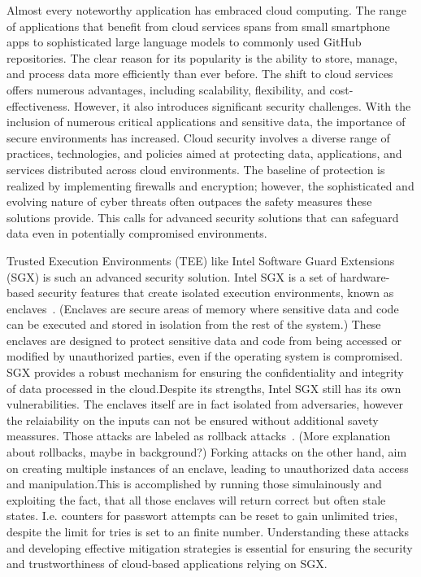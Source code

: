 
Almost every noteworthy application has embraced cloud computing. The range of applications that benefit from cloud services spans from small smartphone apps to sophisticated large language models to commonly used GitHub repositories. The clear reason for its popularity is the ability to store, manage, and process data more efficiently than ever before. The shift to cloud services offers numerous advantages, including scalability, flexibility, and cost-effectiveness. However, it also introduces significant security challenges. With the inclusion of numerous critical applications and sensitive data, the importance of secure environments has increased. Cloud security involves a diverse range of practices, technologies, and policies aimed at protecting data, applications, and services distributed across cloud environments. The baseline of protection is realized by implementing firewalls and encryption; however, the sophisticated and evolving nature of cyber threats often outpaces the safety measures these solutions provide. This calls for advanced security solutions that can safeguard data even in potentially compromised environments.

Trusted Execution Environments (TEE) like Intel Software Guard Extensions (SGX) is such an advanced security solution. Intel SGX is a set of hardware-based security features that create isolated execution environments, known as enclaves~\cite{nfw}. 
(Enclaves are secure areas of memory where sensitive data and code can be executed and stored in isolation from the rest of the system.) These enclaves are designed to protect sensitive data and code from being accessed or modified by unauthorized parties, even if the operating system is compromised. SGX provides a robust mechanism for ensuring the confidentiality and integrity of data processed in the cloud.Despite its strengths, Intel SGX still has its own vulnerabilities. The enclaves itself are in fact isolated from adversaries, however the relaiability on the inputs can not be ensured without additional savety meassures. Those attacks are labeled as rollback attacks~\cite{esccc}. (More explanation about rollbacks, maybe in background?)
Forking attacks on the other hand, aim on creating multiple instances of an enclave, leading to unauthorized data access and manipulation.This is accomplished by running those simulainously and exploiting the fact, that all those enclaves will return correct but often stale states. I.e. counters for passwort attempts can be reset to gain unlimited tries, despite the limit for tries is set to an finite number. Understanding these attacks and developing effective mitigation strategies is essential for ensuring the security and trustworthiness of cloud-based applications relying on SGX.



